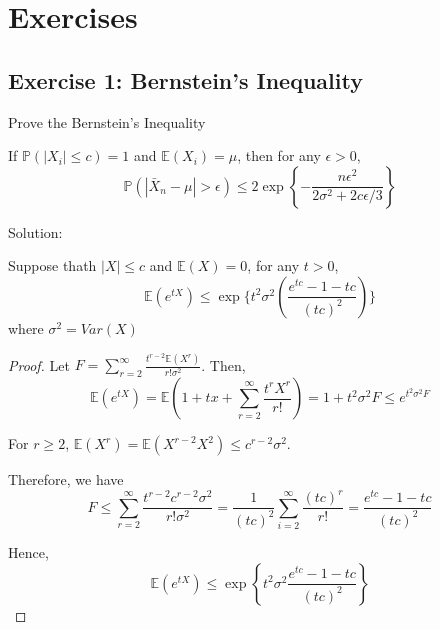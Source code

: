 

\section{Exercises}

\subsection{Exercise 1: Bernstein's Inequality}
Prove the Bernstein's Inequality

If $\mathbb{P}( \left| X_i \right| \leq c) = 1$ and $\mathbb{E}(X_i) = \mu$, then for any $\epsilon > 0$,
\begin{equation}
    \mathbb{P}\left(\left|\bar{X}_{n}-\mu\right|>\epsilon\right) \leq 2 \exp \left\{-\frac{n \epsilon^{2}}{2 \sigma^{2}+2 c \epsilon / 3}\right\}
\end{equation}

Solution:

\begin{lemma} \cite*{John:2008}
    Suppose thath $\left| X \right| \leq c$ and $\mathbb{E}(X) = 0$, for any $t >0$,
    \begin{equation}
      \mathbb{E}(e^{t X}) \leq \exp \{ t^2 \sigma^2 ( \frac{e^{t c} -1 -t c}{(t c)^2}) \}
    \end{equation}
    where $\sigma^2 = Var(X)$
\end{lemma}

\begin{proof}
    Let $F=\sum_{r=2}^{\infty} \frac{t^{r-2} \mathbb{E}\left(X^{r}\right)}{r ! \sigma^{2}}$.
    Then, 
    \begin{equation}
        \mathbb{E}\left(e^{t X}\right)=\mathbb{E}\left(1+t x+\sum_{r=2}^{\infty} \frac{t^{r} X^{r}}{r !}\right)=1+t^{2} \sigma^{2} F \leq e^{t^{2} \sigma^{2} F}
    \end{equation}

    For $r \geq 2$, $\mathbb{E}\left(X^{r}\right)=\mathbb{E}\left(X^{r-2} X^{2}\right) \leq c^{r-2} \sigma^{2}$.

    Therefore, we have 
    \begin{equation}
        F \leq \sum_{r=2}^{\infty} \frac{t^{r-2} c^{r-2} \sigma^{2}}{r ! \sigma^{2}}=\frac{1}{(t c)^{2}} \sum_{i=2}^{\infty} \frac{(t c)^{r}}{r !}=\frac{e^{t c}-1-t c}{(t c)^{2}}
    \end{equation}

    Hence, 
    \begin{equation}
        \mathbb{E}\left(e^{t X}\right) \leq \exp \left\{t^{2} \sigma^{2} \frac{e^{t c}-1-t c}{(t c)^{2}}\right\}
    \end{equation}
\end{proof}

